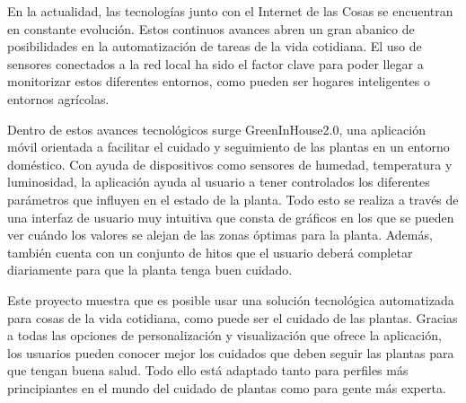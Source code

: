 
En la actualidad, las tecnologías junto con el Internet de las Cosas se encuentran en constante evolución. Estos continuos avances abren un gran abanico de posibilidades en la automatización de tareas de la vida cotidiana. El uso de sensores conectados a la red local ha sido el factor clave para poder llegar a monitorizar estos diferentes entornos, como pueden ser hogares inteligentes o entornos agrícolas.

Dentro de estos avances tecnológicos surge GreenInHouse2.0, una aplicación móvil orientada a facilitar el cuidado y seguimiento de las plantas en un entorno doméstico. Con ayuda de dispositivos como sensores de humedad, temperatura y luminosidad, la aplicación ayuda al usuario a tener controlados los diferentes parámetros que influyen en el estado de la planta. Todo esto  se realiza a través de una interfaz de usuario muy intuitiva que consta de gráficos en los que se pueden ver cuándo los valores se alejan de las zonas óptimas para la planta. Además, también cuenta con un conjunto de hitos que el usuario deberá completar diariamente para que la planta tenga buen cuidado.

Este proyecto muestra que es posible usar una solución tecnológica automatizada para cosas de la vida cotidiana, como puede ser el cuidado de las plantas. Gracias a todas las opciones de personalización y visualización que ofrece la aplicación, los usuarios pueden conocer mejor los cuidados que deben seguir las plantas para que tengan buena salud. Todo ello está adaptado tanto para perfiles más principiantes en el mundo del cuidado de plantas como para gente más experta.

